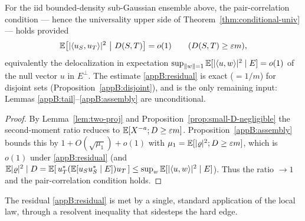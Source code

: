 \begin{theorem}\label{appB:reduction}
For the iid bounded-density sub-Gaussian ensemble above, the pair-correlation condition --- hence
the universality upper side of Theorem~\ref{thm:conditional-univ} --- holds provided
\begin{equation}\label{appB:residual}
  \EE\big[|\langle u_S,u_T\rangle|^2\ \big|\ D(S,T)\big]=o(1)\qquad(D(S,T)\ge\varepsilon m),
\end{equation}
equivalently the delocalization in expectation
$\sup_{\|w\|=1}\mathbb{E}[|\langle u,w\rangle|^2\mid E]=o(1)$ of the null vector $u$ in $E^\perp$.  The
estimate \eqref{appB:residual} is exact ($=1/m$) for disjoint sets
(Proposition~\ref{appB:disjoint}), and is the only remaining input: Lemmas
\ref{appB:tail}--\ref{appB:assembly} are unconditional.
\end{theorem}

\begin{proof}
By Lemma~\ref{lem:two-proj} and Proposition~\ref{prop:small-D-negligible} the second-moment ratio
reduces to $\mathbb{E}[X^{-a};D\ge\varepsilon m]$.  Proposition~\ref{appB:assembly} bounds this by
$1+O(\sqrt{\mu_1})+o(1)$ with $\mu_1=\mathbb{E}[|\varrho|^2;D\ge\varepsilon m]$, which is $o(1)$ under
\eqref{appB:residual} (and $\mathbb{E}|\varrho|^2\mid D=\mathbb{E}[\,u_T^*(\mathbb{E}[u_Su_S^*\mid E])u_T\,]\le
\sup_w\mathbb{E}[|\langle u,w\rangle|^2\mid E]$).  Thus the ratio $\to1$ and the pair-correlation
condition holds.
\end{proof}

The residual \eqref{appB:residual} is met by a single, standard application of the local law,
through a resolvent inequality that sidesteps the hard edge.

